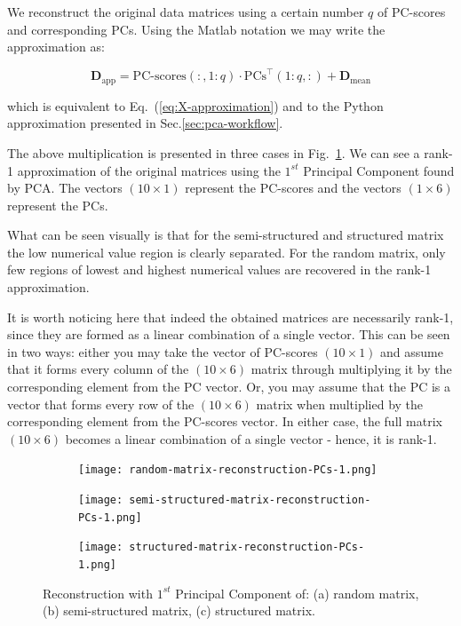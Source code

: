 \documentclass[10pt,twocolumn]{article}
\begin{document}
We reconstruct the original data matrices using a certain number $q$ of PC-scores and corresponding PCs. Using the Matlab notation we may write the approximation as:

\begin{equation} \label{eq:data-set-approximation}
\mathbf{D}_{\text{app}} = \text{PC-scores}(:,1:q) \cdot \text{PCs}^{\top}(1:q,:) + \mathbf{D}_{\text{mean}}
\end{equation}

which is equivalent to Eq.~(\ref{eq:X-approximation}) and to the Python approximation presented in Sec.\ref{sec:pca-workflow}.

The above multiplication is presented in three cases in Fig.~\ref{fig:matrices-reconstruction-1}. We can see a rank-1 approximation of the original matrices using the $1^{st}$ Principal Component found by PCA. The vectors $(10 \times 1)$ represent the PC-scores and the vectors $(1 \times 6)$ represent the PCs.

What can be seen visually is that for the semi-structured and structured matrix the low numerical value region is clearly separated. For the random matrix, only few regions of lowest and highest numerical values are recovered in the rank-1 approximation.


It is worth noticing here that indeed the obtained matrices are necessarily rank-1, since they are formed as a linear combination of a single vector. This can be seen in two ways: either you may take the vector of PC-scores $(10 \times 1)$ and assume that it forms every column of the $(10 \times 6)$ matrix through multiplying it by the corresponding element from the PC vector. Or, you may assume that the PC is a vector that forms every row of the $(10 \times 6)$ matrix when multiplied by the corresponding element from the PC-scores vector. In either case, the full matrix $(10 \times 6)$ becomes a linear combination of a single vector - hence, it is rank-1.

\begin{figure}[H]
\begin{subfigure}[t]{.15\textwidth}
\centering
\texttt{[image: random-matrix-reconstruction-PCs-1.png]}
\caption{ }
\end{subfigure}
\begin{subfigure}[t]{.15\textwidth}
\centering
\texttt{[image: semi-structured-matrix-reconstruction-PCs-1.png]}
\caption{ }
\end{subfigure}
\begin{subfigure}[t]{.15\textwidth}
\centering
\texttt{[image: structured-matrix-reconstruction-PCs-1.png]}
\caption{ }
\end{subfigure}
\caption{Reconstruction with $1^{st}$ Principal Component of: (a) random matrix, (b) semi-structured matrix, (c) structured matrix.}
\label{fig:matrices-reconstruction-1}
\end{figure}
\end{document}
